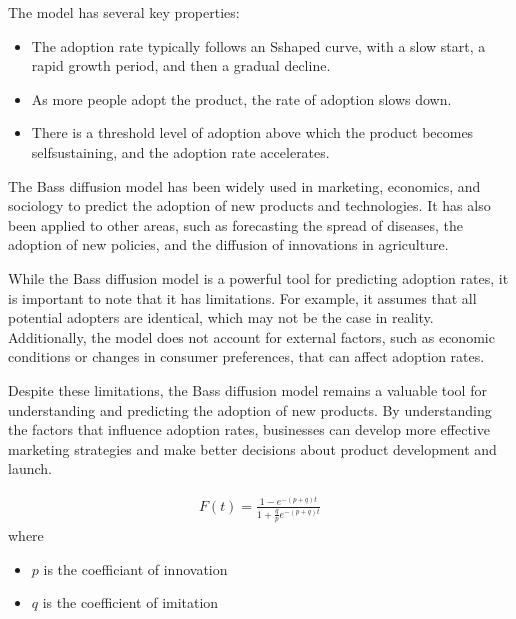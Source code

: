 \documentclass[letterpaper,10pt,english]{jupyterBook}
\begin{document}
\sphinxAtStartPar
The model has several key properties:
\begin{itemize}
\item {} 
\sphinxAtStartPar
{} The adoption rate typically follows an S\sphinxhyphen{}shaped curve, with a slow start, a rapid growth period, and then a gradual decline.

\item {} 
\sphinxAtStartPar
{} As more people adopt the product, the rate of adoption slows down.

\item {} 
\sphinxAtStartPar
{} There is a threshold level of adoption above which the product becomes self\sphinxhyphen{}sustaining, and the adoption rate accelerates.

\end{itemize}

\sphinxAtStartPar
The Bass diffusion model has been widely used in marketing, economics, and sociology to predict the adoption of new products and technologies. It has also been applied to other areas, such as forecasting the spread of diseases, the adoption of new policies, and the diffusion of innovations in agriculture.

\sphinxAtStartPar
While the Bass diffusion model is a powerful tool for predicting adoption rates, it is important to note that it has limitations. For example, it assumes that all potential adopters are identical, which may not be the case in reality. Additionally, the model does not account for external factors, such as economic conditions or changes in consumer preferences, that can affect adoption rates.

\sphinxAtStartPar
Despite these limitations, the Bass diffusion model remains a valuable tool for understanding and predicting the adoption of new products. By understanding the factors that influence adoption rates, businesses can develop more effective marketing strategies and make better decisions about product development and launch.


\begin{equation*}
\begin{split}F(t) = \frac{1-e^{-(p+q)t}}{1+\frac{q}{p}e^{-(p+q)t}} \end{split}
\end{equation*}
\sphinxAtStartPar
where

\begin{itemize}
\item {} 
\sphinxAtStartPar
\(p\) is the coefficiant of innovation


\item {} 
\sphinxAtStartPar
\(q\) is the coefficient of imitation


\end{itemize}
\end{document}
